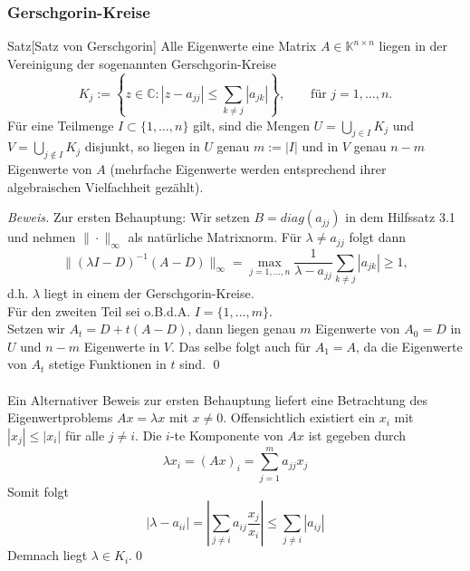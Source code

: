 \documentclass{article}
\begin{document}
    \subsubsection{Gerschgorin-Kreise}
    \begin{thmbox}{Satz}[Satz von Gerschgorin]
        Alle Eigenwerte eine Matrix $A\in\mathbb{K}^{n\times n}$ liegen in der Vereinigung der sogenannten 
        Gerschgorin-Kreise
        \[K_j := \left\{z\in\mathbb{C} : |z-a_{jj}|\leq \sum_{k\neq j} |a_{jk}|\right\},
        \qquad \text{für } j=1,\dotsc,n.\]
        Für eine Teilmenge $I\subset\{1,\dotsc,n\}$ gilt, sind die Mengen $U=\displaystyle \bigcup_{j\in I} K_j$ 
        und $V=\displaystyle \bigcup_{j\notin I} K_j$ disjunkt, so liegen in $U$ genau $m:=|I|$ und in $V$ genau $n-m$ 
        Eigenwerte von $A$ (mehrfache Eigenwerte werden entsprechend ihrer algebraischen Vielfachheit gezählt).
    \end{thmbox}
    \textit{Beweis.} Zur ersten Behauptung: Wir setzen $B=diag(a_{jj})$ in dem Hilfssatz 3.1 und nehmen 
    $\|\cdot\|_\infty$ als natürliche Matrixnorm. Für $\lambda\neq a_{jj}$ folgt dann 
    \[\|(\lambda I -D)^{-1}(A-D)\|_\infty = \max_{j=1,\dotsc,n}\dfrac{1}{\lambda-a_{jj}}\sum_{k\neq j} |a_{jk}|\geq 1,\]
    d.h. $\lambda$ liegt in einem der Gerschgorin-Kreise. \\
    Für den zweiten Teil sei o.B.d.A. $I=\{1,\dotsc,m\}$. \\
    Setzen wir $A_t = D + t(A-D)$, dann liegen genau $m$ Eigenwerte von $A_0=D$ in $U$ und $n-m$ 
    Eigenwerte in $V$. Das selbe folgt auch für $A_1=A$, da die Eigenwerte von $A_t$ stetige Funktionen in $t$ sind. 
    \qed \\ \\
    Ein Alternativer Beweis zur ersten Behauptung liefert eine Betrachtung des 
    Eigenwertproblems $Ax=\lambda x$ mit $x\neq 0$. Offensichtlich existiert ein $x_i$ mit $|x_j|\leq |x_i|$ für alle 
    $j\neq i$. Die $i$-te Komponente von $Ax$ ist gegeben durch 
    \[\lambda x_i = (Ax)_i = \sum_{j=1}^{m} a_{jj}x_j \]
    Somit folgt 
    \[|\lambda-a_{ii}| = \left|\sum_{j\neq i} a_{ij} \dfrac{x_j}{x_i}\right|\leq \sum_{j\neq i}|a_{ij}|\]
    Demnach liegt $\lambda\in K_i$.\qed
\end{document}
